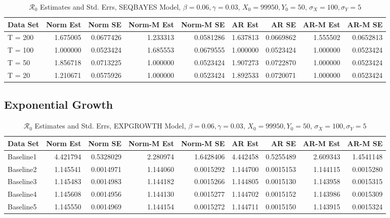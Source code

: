 \documentclass[12pt]{article}
\newcommand{\rr}{\ensuremath{\mathcal{R}_0}}
\begin{document}
\begin{table}[H]
	
	\caption{\label{tab:}$\rr$ Estimates and Std. Errs, SEQBAYES Model,
		$\beta = 0.06, \gamma = 0.03$, $X_0 = 99950, Y_0 = 50$, $\sigma_X = 100, \sigma_Y = 5$}
	\centering
	\begin{tabular}[t]{l|r|r|r|r|r|r|r|r}
		\hline
		Data Set & Norm Est & Norm SE & Norm-M Est & Norm-M SE & AR Est & AR SE & AR-M Est & AR-M SE\\
		\hline
		T = 200 & 1.675005 & 0.0677426 & 1.233313 & 0.0581286 & 1.637813 & 0.0669862 & 1.555502 & 0.0652813\\
		\hline
		T = 100 & 1.000000 & 0.0523424 & 1.685553 & 0.0679555 & 1.000000 & 0.0523424 & 1.000000 & 0.0523424\\
		\hline
		T = 50 & 1.856718 & 0.0713225 & 1.000000 & 0.0523424 & 1.907273 & 0.0722870 & 1.000000 & 0.0523424\\
		\hline
		T = 20 & 1.210671 & 0.0575926 & 1.000000 & 0.0523424 & 1.892533 & 0.0720071 & 1.000000 & 0.0523424\\
		\hline
	\end{tabular}
\end{table}

\subsection{Exponential Growth}

\begin{table}
	
	\caption{\label{tab:}$\rr$ Estimates and Std. Errs, EXPGROWTH Model,
		$\beta = 0.06, \gamma = 0.03$, $X_0 = 99950, Y_0 = 50$, $\sigma_X = 100, \sigma_Y = 5$}
	\centering
	\begin{tabular}[t]{l|r|r|r|r|r|r|r|r}
		\hline
		Data Set & Norm Est & Norm SE & Norm-M Est & Norm-M SE & AR Est & AR SE & AR-M Est & AR-M SE\\
		\hline
		Baseline1 & 4.421794 & 0.5328029 & 2.280974 & 1.6428406 & 4.442458 & 0.5255489 & 2.609343 & 1.4541148\\
		\hline
		Baseline2 & 1.145541 & 0.0014971 & 1.144060 & 0.0015292 & 1.144700 & 0.0015153 & 1.144115 & 0.0015280\\
		\hline
		Baseline3 & 1.145483 & 0.0014983 & 1.144182 & 0.0015266 & 1.144805 & 0.0015130 & 1.143958 & 0.0015315\\
		\hline
		Baseline4 & 1.145608 & 0.0014956 & 1.144130 & 0.0015277 & 1.144702 & 0.0015152 & 1.143986 & 0.0015309\\
		\hline
		Baseline5 & 1.145550 & 0.0014969 & 1.144154 & 0.0015272 & 1.144711 & 0.0015150 & 1.143915 & 0.0015324\\
		\hline
	\end{tabular}
\end{table}
\end{document}
